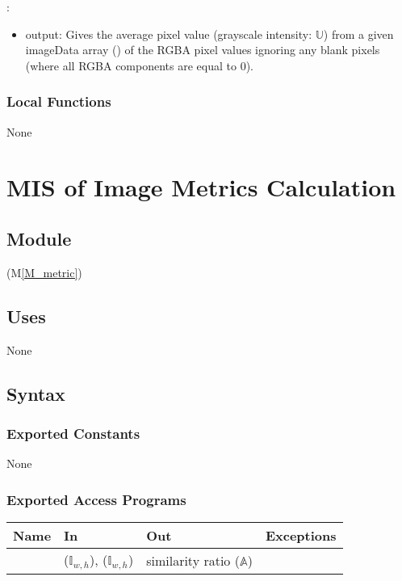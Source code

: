 \documentclass[12pt, titlepage]{article}
\newcommand{\mref}[1]{M\ref{#1}}
\newcommand{\mrefp}[1]{(\mref{#1})}
\begin{document}
\noindent {}:
\begin{itemize}
  \item output: Gives the average pixel value (grayscale intensity: $\mathbb{U}$) from a given imageData
  array () of the RGBA pixel values ignoring
  any blank pixels (where all RGBA components are equal to 0).
\end{itemize}

\subsubsection{Local Functions}
None

\newpage



\section{MIS of Image Metrics Calculation} \label{MS_metrics}

\subsection{Module}
 \mrefp{M_metric}

\subsection{Uses}
None

\subsection{Syntax}

\subsubsection{Exported Constants}
None

\subsubsection{Exported Access Programs}

\begin{center}
\begin{tabular}{L{2cm} L{4cm} L{4cm} L{5cm}}
\hline
\textbf{Name} & \textbf{In} & \textbf{Out} & \textbf{Exceptions} \\
\hline
{} &  ($\mathbb{I}_{w,h}$),  ($\mathbb{I}_{w,h}$)
  & similarity ratio ($\mathbb{A}$) &  \\
\hline
\end{tabular}
\end{center}
\end{document}
